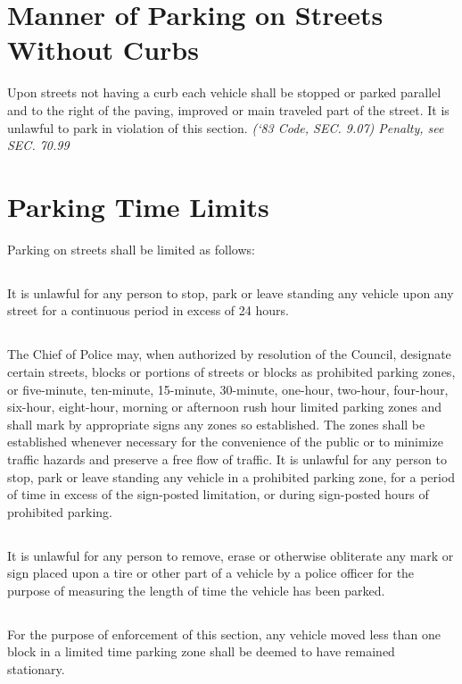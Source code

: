 \documentclass[code.tex]{subfiles}
\begin{document}
\section{Manner of Parking on Streets Without Curbs}
Upon streets not having a curb each vehicle shall be stopped or parked parallel and to the right of the paving, improved or main traveled part of the street.  It is unlawful to park in violation of this section.\newline
\emph{(‘83 Code, SEC. 9.07)  Penalty, see SEC. 70.99}

\section{Parking Time Limits}
Parking on streets shall be limited as follows:
\subsection{}
It is unlawful for any person to stop, park or leave standing any vehicle upon any street for a continuous period in excess of 24 hours.
\subsection{}
The Chief of Police may, when authorized by resolution of the Council, designate certain streets, blocks or portions of streets or blocks as prohibited parking zones, or five-minute, ten-minute, 15-minute, 30-minute, one-hour, two-hour, four-hour, six-hour, eight-hour, morning or afternoon rush hour limited parking zones and shall mark by appropriate signs any zones so established.  The zones shall be established whenever necessary for the convenience of the public or to minimize traffic hazards and preserve a free flow of traffic.  It is unlawful for any person to stop, park or leave standing any vehicle in a prohibited parking zone, for a period of time in excess of the sign-posted limitation, or during sign-posted hours of prohibited parking.
\subsection{}
It is unlawful for any person to remove, erase or otherwise obliterate any mark or sign placed upon a tire or other part of a vehicle by a police officer for the purpose of measuring the length of time the vehicle has been parked.
\subsection{}
For the purpose of enforcement of this section, any vehicle moved less than one block in a limited time parking zone shall be deemed to have remained stationary.
\end{document}
